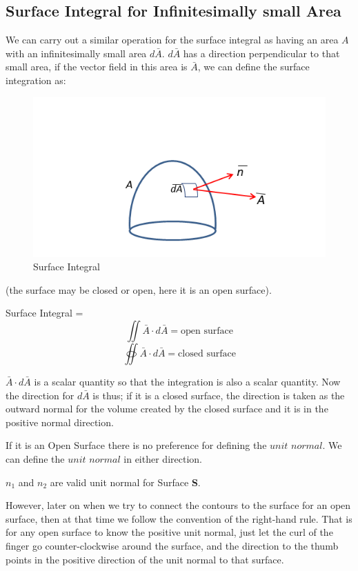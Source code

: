\subsection{Surface Integral for Infinitesimally small Area}
We can carry out a similar operation for the surface integral as having an area $A$ with an infinitesimally small area $d\bar{A}$. $d\bar{A}$ has a direction perpendicular to that small area, if the vector field in this area is $\bar{A}$, we can define the surface integration as:
\begin{figure}
\centering
\includegraphics[width=1\linewidth]{./graphics/surface_Int}
\caption{Surface Integral}
\end{figure}
(the surface may be closed or open, here it is an open surface).

Surface Integral =
\begin{equation*}
{   \iint \bar{A} \cdot d\bar{A}= \text{open surface} }
\end{equation*}
\begin{equation}
\oiint \bar{A} \cdot d\bar{A} = \text{closed surface}
\end{equation}

$\bar{A} \cdot d\bar{A}$ is a scalar quantity so that the integration is also a scalar quantity. Now the direction for $d\bar{A}$ is thus; if it is a closed surface, the direction is taken as the outward normal for the volume created by the closed surface and it is in the positive normal direction.

If it is an Open Surface there is no preference for defining the $unit$ $normal$. We can define the $unit$ $normal$ in either direction.

$n_1$ and $n_2$ are valid unit normal for Surface \textbf{S}.

However, later on when we try to connect the contours to the surface for an open surface, then at that time we follow the convention of the right-hand rule. That is for any open surface to know the positive unit normal, just let the curl of the finger go counter-clockwise around the surface, and the direction to the thumb points in the positive direction of the unit normal to that surface.

